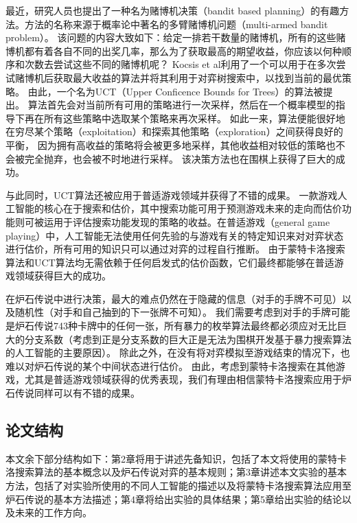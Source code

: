 最近，研究人员也提出了一种名为赌博机决策（bandit based planning）的有趣方法\cite{kocsis2006bandit}。方法的名称来源于概率论中著名的多臂赌博机问题（multi-armed bandit problem）。
该问题的内容大致如下：给定一排若干数量的赌博机，所有的这些赌博机都有着各自不同的出奖几率，那么为了获取最高的期望收益，你应该以何种顺序和次数去尝试这些不同的赌博机呢？
Kocsis et al\cite{kocsis2006bandit}利用了一个可以用于在多次尝试赌博机后获取最大收益的算法并将其利用于对弈树搜索中，以找到当前的最优策略。
由此，一个名为UCT（Upper Conficence Bounds for Trees）的算法被提出。
算法首先会对当前所有可用的策略进行一次采样，然后在一个概率模型的指导下再在所有这些策略中选取某个策略来再次采样。
如此一来，算法便能很好地在穷尽某个策略（exploitation）和探索其他策略（exploration）之间获得良好的平衡，
因为拥有高收益的策略将会被更多地采样，其他收益相对较低的策略也不会被完全抛弃，也会被不时地进行采样。
该决策方法也在围棋上获得了巨大的成功\cite{wang2007modifications,lee2009computational}。

与此同时，UCT算法还被应用于普适游戏领域并获得了不错的成果\cite{finnsson2008simulation}。
一款游戏人工智能的核心在于搜索和估价，其中搜索功能可用于预测游戏未来的走向而估价功能则可被运用于评估搜索功能发现的策略的收益。在普适游戏（general game playing）中，人工智能无法使用任何先验的与游戏有关的特定知识来对对弈状态进行估价，所有可用的知识只可以通过对弈的过程自行推断\cite{clune2007heuristic}。
由于蒙特卡洛搜索算法和UCT算法均无需依赖于任何启发式的估价函数，它们最终都能够在普适游戏领域获得巨大的成功\cite{sharma2008knowledge}。

在炉石传说中进行决策，最大的难点仍然在于隐藏的信息（对手的手牌不可见）以及随机性（对手和自己抽到的下一张牌不可知）。
我们需要考虑到对手的手牌可能是炉石传说743种卡牌中的任何一张，所有暴力的枚举算法最终都必须应对无比巨大的分支系数（考虑到正是分支系数的巨大正是无法为围棋开发基于暴力搜索算法的人工智能的主要原因）。
除此之外，在没有将对弈模拟至游戏结束的情况下，也难以对炉石传说的某个中间状态进行估价。
由此，考虑到蒙特卡洛搜索在其他游戏，尤其是普适游戏领域获得的优秀表现，我们有理由相信蒙特卡洛搜索应用于炉石传说同样可以有不错的成果。

\subsection{论文结构}
\label{section:structure}

本文余下部分结构如下：第2章将用于讲述先备知识，包括了本文将使用的蒙特卡洛搜索算法的基本概念以及炉石传说对弈的基本规则；第3章讲述本文实验的基本方法，包括了对实验所使用的不同人工智能的描述以及将蒙特卡洛搜索算法应用至炉石传说的基本方法描述；第4章将给出实验的具体结果；第5章给出实验的结论以及未来的工作方向。
